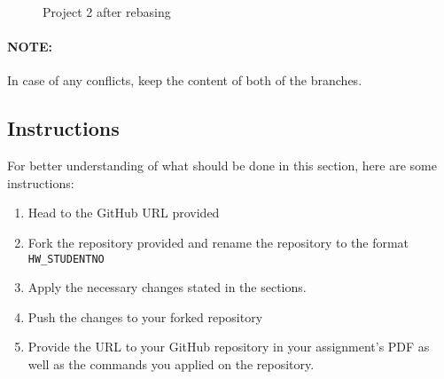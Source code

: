 \documentclass[titlepage]{article}
\begin{document}
\begin{figure}[ht]
    \centering
    \caption{Project 2 after rebasing}
    \label{fig:project2-after}
\end{figure}

\paragraph{NOTE:}
In case of any conflicts, keep the content of both of the branches.

\subsection{Instructions}
For better understanding of what should be done in this section, here are some instructions:
\begin{enumerate}
    \item Head to the GitHub URL provided
    \item Fork the repository provided and rename the repository to the format \texttt{HW\_STUDENTNO}
    \item Apply the necessary changes stated in the sections.
    \item Push the changes to your forked repository
    \item Provide the URL to your GitHub repository in your assignment's PDF as well as the commands you
        applied on the repository.
\end{enumerate}
\end{document}
